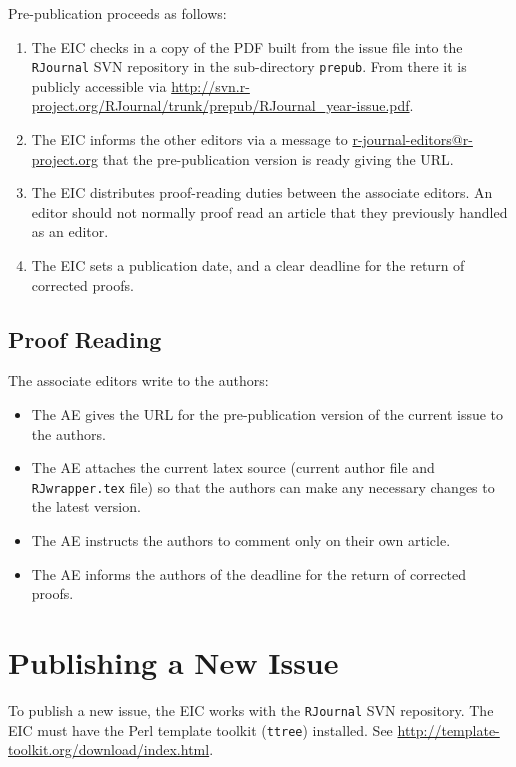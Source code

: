 \documentclass[11pt]{article}
\begin{document}
Pre-publication proceeds as follows:

\begin{enumerate}
\item The EIC checks in a copy of the PDF built from the issue file
  into the \texttt{RJournal} SVN repository in the sub-directory
  \texttt{prepub}. From there it is publicly accessible via
  \url{http://svn.r-project.org/RJournal/trunk/prepub/RJournal_year-issue.pdf}.
\item The EIC informs the other editors via a message to
  \url{r-journal-editors@r-project.org} that the pre-publication
  version is ready giving the URL.
\item The EIC distributes proof-reading duties between the associate
  editors. An editor should not normally proof read an article that
  they previously handled as an editor.
\item The EIC sets a publication date, and a clear deadline for the
  return of corrected proofs.
\end{enumerate}

\subsection{Proof Reading}

The associate editors write to the authors:
\begin{itemize}
\item The AE gives the URL for the pre-publication version of the
  current issue to the authors.
\item The AE attaches the current latex source (current author file
  and \texttt{RJwrapper.tex} file) so that the authors can make any
  necessary changes to the latest version.
\item The AE instructs the authors to comment only on their own article.
\item The AE informs the authors of the deadline for the return of
  corrected proofs.
\end{itemize}

\section{Publishing a New Issue}

To publish a new issue, the EIC works with the \texttt{RJournal} SVN
repository. The EIC must have the Perl template toolkit
(\texttt{ttree}) installed. See
\url{http://template-toolkit.org/download/index.html}. 
\end{document}
